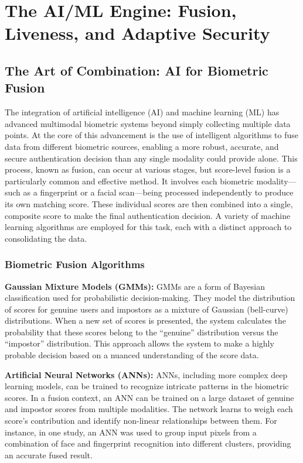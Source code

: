 
\chapter{The AI/ML Engine: Fusion, Liveness, and Adaptive Security}

\section{The Art of Combination: AI for Biometric Fusion}

The integration of artificial intelligence (AI) and machine learning (ML) has advanced multimodal biometric systems beyond simply collecting multiple data points. At the core of this advancement is the use of intelligent algorithms to fuse data from different biometric sources, enabling a more robust, accurate, and secure authentication decision than any single modality could provide alone. This process, known as fusion, can occur at various stages, but score-level fusion is a particularly common and effective method. It involves each biometric modality---such as a fingerprint or a facial scan---being processed independently to produce its own matching score. These individual scores are then combined into a single, composite score to make the final authentication decision. A variety of machine learning algorithms are employed for this task, each with a distinct approach to consolidating the data.

\subsection{Biometric Fusion Algorithms}

\textbf{Gaussian Mixture Models (GMMs):} GMMs are a form of Bayesian classification used for probabilistic decision-making. They model the distribution of scores for genuine users and impostors as a mixture of Gaussian (bell-curve) distributions. When a new set of scores is presented, the system calculates the probability that these scores belong to the ``genuine'' distribution versus the ``impostor'' distribution. This approach allows the system to make a highly probable decision based on a nuanced understanding of the score data.

\textbf{Artificial Neural Networks (ANNs):} ANNs, including more complex deep learning models, can be trained to recognize intricate patterns in the biometric scores. In a fusion context, an ANN can be trained on a large dataset of genuine and impostor scores from multiple modalities. The network learns to weigh each score's contribution and identify non-linear relationships between them. For instance, in one study, an ANN was used to group input pixels from a combination of face and fingerprint recognition into different clusters, providing an accurate fused result.

